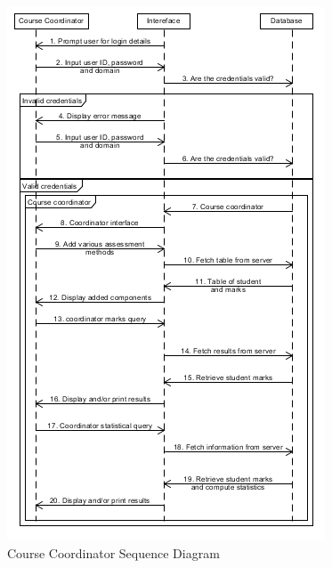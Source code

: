 	
	\begin{center}
		\begin{figure}[h]
			\centering
			\includegraphics[trim={0cm 0cm 0cm 0cm },clip,scale = 1.1]{CoordinatorSequence}
			\caption{Course Coordinator Sequence Diagram}
		\end{figure}
	\end{center}


